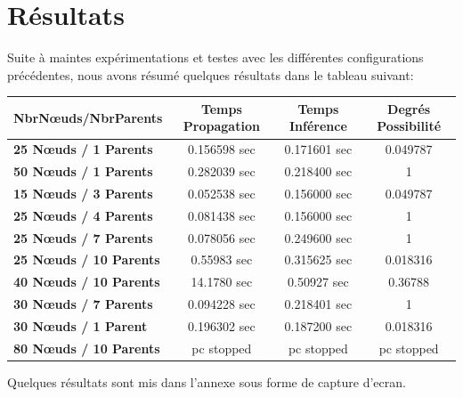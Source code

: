 \documentclass[12pt,a4paper,oneside]{book}
\begin{document}
    \section{Résultats}
    Suite à maintes expérimentations et testes avec les différentes configurations précédentes, nous avons résumé quelques résultats dans le tableau suivant: 
\begin{center}
\begin{tabular}{|l||c|c|c|}
	\hline
	\textbf{NbrNœuds/NbrParents} &	\textbf{Temps Propagation} & \textbf{Temps Inférence} &  \textbf{Degrés Possibilité}
	\\
	\hline
	

		
	\textbf{25 Nœuds / 1 Parents} & 0.156598 sec & 0.171601 sec  & 0.049787
	\\
	\hline
	
	\textbf{50 Nœuds / 1 Parents} & 0.282039 sec & 0.218400 sec  & 1
	\\
	\hline
	
	\textbf{15 Nœuds / 3 Parents} & 0.052538 sec & 0.156000 sec  & 0.049787
	\\
	\hline
	
	\textbf{25 Nœuds / 4 Parents} &  0.081438 sec & 0.156000 sec  & 1
	\\
	\hline
	
	\textbf{25 Nœuds / 7 Parents} & 0.078056 sec & 0.249600 sec  & 1
	\\
	\hline
	
	\textbf{25 Nœuds / 10 Parents} & 0.55983 sec & 0.315625 sec  & 0.018316
	\\
	\hline
	
	\textbf{40 Nœuds / 10 Parents} &  14.1780 sec & 0.50927 sec & 0.36788
	\\
	\hline
	
	
	\textbf{30 Nœuds / 7 Parents} &  0.094228 sec & 0.218401 sec & 1
	\\
	\hline
	
	\textbf{30 Nœuds / 1 Parent} &  0.196302 sec & 0.187200 sec & 0.018316
	\\
	\hline
	
	\textbf{80 Nœuds / 10 Parents} & pc stopped & pc stopped   & pc stopped
	\\
	\hline
	



\end{tabular} 
\end{center}
Quelques résultats sont mis dans l'annexe sous forme de capture d'ecran.
    
\end{document}
